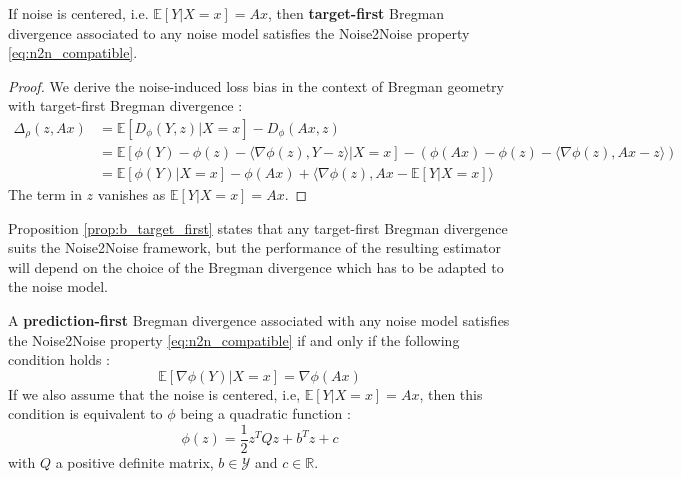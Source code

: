 \begin{proposition}
    \label{prop:b_target_first}
    If noise is centered, i.e. $\mathbb{E}[Y | X=x] = Ax$, then \textbf{target-first} Bregman divergence associated to any noise model satisfies the Noise2Noise property \eqref{eq:n2n_compatible}.
\end{proposition}
\begin{proof}
    We derive the noise-induced loss bias in the context of Bregman geometry with target-first Bregman divergence :
    \begin{align*}
        \Delta_\rho(z, Ax) &= \mathbb{E}[D_\phi(Y, z) | X=x] - D_\phi(Ax, z) \\
        &= \mathbb{E}[\phi(Y) - \phi(z) - \langle \nabla \phi(z), Y - z \rangle | X=x] - (\phi(Ax) - \phi(z) - \langle \nabla \phi(z), Ax - z \rangle) \\
        &= \mathbb{E}[\phi(Y) | X=x] - \phi(Ax) + \langle \nabla \phi(z), Ax - \mathbb{E}[Y | X=x] \rangle
    \end{align*}
The term in $z$ vanishes as $\mathbb{E}[Y | X=x] = Ax$.
\end{proof}
\noindent Proposition \ref{prop:b_target_first} states that any target-first Bregman divergence suits the Noise2Noise framework, but the performance of the resulting estimator will depend on the choice of the Bregman divergence which has to be adapted to the noise model.
\begin{proposition}
    A \textbf{prediction-first} Bregman divergence associated with any noise model satisfies the Noise2Noise property \eqref{eq:n2n_compatible} if and only if the following condition holds :
    \begin{equation}
        \label{prop:b_prediction_first}
        \mathbb{E}[\nabla \phi(Y) | X=x] = \nabla \phi(Ax)
    \end{equation}
    If we also assume that the noise is centered, i.e, $\mathbb{E}[Y | X=x] = Ax$, then this condition is equivalent to $\phi$ being a quadratic function :
    \begin{equation}
        \phi(z) = \frac{1}{2} z^T Q z + b^T z + c
    \end{equation}
    with $Q$ a positive definite matrix, $b \in \mathcal{Y}$ and $c \in \mathbb{R}$.
\end{proposition}

